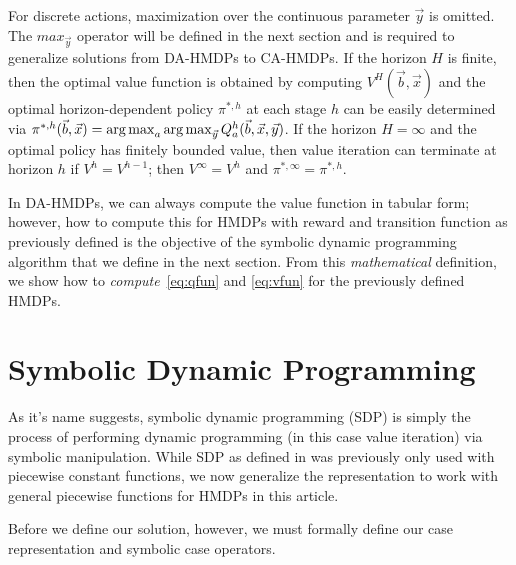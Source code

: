 \documentclass[twoside,11pt]{article}
\def\argmax{\operatornamewithlimits{arg\max}}
\begin{document}
For discrete actions, maximization over the continuous parameter $\vec{y}$ is omitted. The $max_{\vec{y}}$ operator will be defined in the next section and is required to generalize solutions from DA-HMDPs to CA-HMDPs.
If the horizon $H$ is finite, then the optimal value function is
obtained by computing $V^H(\vec{b},\vec{x})$ and the optimal
horizon-dependent policy $\pi^{*,h}$ at each stage $h$ can be easily
determined via $\pi^{*,h}(\vec{b},\vec{x}) = \argmax_a
\argmax_{\vec{y}} Q^h_a(\vec{b},\vec{x},\vec{y})$.  If the horizon $H
= \infty$ and the optimal policy has finitely bounded value, then
value iteration can terminate at horizon $h$ if $V^{h} = V^{h-1}$;
then $V^\infty = V^h$ and $\pi^{*,\infty} = \pi^{*,h}$.

In DA-HMDPs, we can always compute the value function in tabular form;
however, how to compute this for HMDPs with reward and transition
function as previously defined is the objective of the symbolic
dynamic programming algorithm that we define in the next section.
From this \emph{mathematical} definition, we  
show how to \emph{compute}~\eqref{eq:qfun} and \eqref{eq:vfun} 
for the previously defined HMDPs.

\section{Symbolic Dynamic Programming} \label{SDP}
As it's name suggests, symbolic dynamic programming (SDP) \cite{fomdp}
is simply the process of performing dynamic programming (in this case
value iteration) via symbolic manipulation.  While SDP as defined
in \cite{fomdp} was previously only used with piecewise
constant functions, we now generalize the representation to work with
general piecewise functions for HMDPs in this article.  

Before we define our solution, however, we must formally define our
case representation and symbolic case operators.
\end{document}
